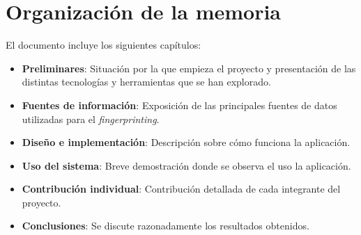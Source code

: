 \section{Organización de la memoria}
El documento incluye los siguientes capítulos:
\begin{itemize}
    \item \textbf{Preliminares}: Situación por la que empieza el proyecto y presentación de las distintas tecnologías y herramientas que se han explorado.
    \item \textbf{Fuentes de información}: Exposición de las principales fuentes de datos utilizadas para el \textit{fingerprinting}.
    \item \textbf{Diseño e implementación}: Descripción sobre cómo funciona la aplicación.
    \item \textbf{Uso del sistema}: Breve demostración donde se observa el uso la aplicación.
    \item \textbf{Contribución individual}: Contribución detallada de cada integrante del proyecto.
    \item \textbf{Conclusiones}: Se discute razonadamente los resultados obtenidos.
\end{itemize}